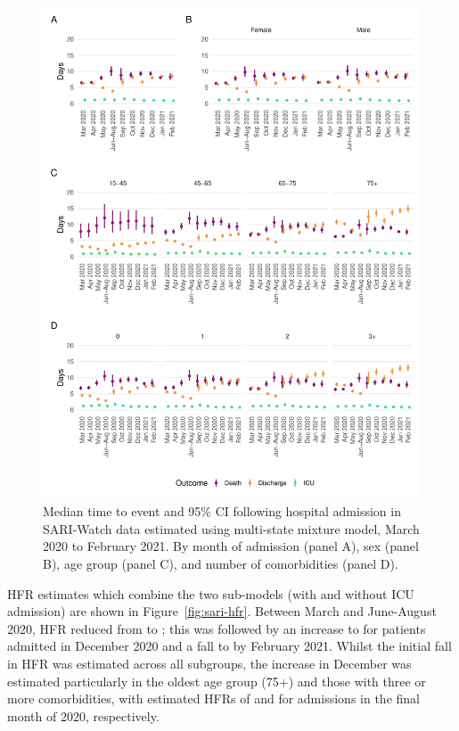 \begin{figure}[htbp!]
    \centering
    \includegraphics[width=\textwidth]{sari_med_time.pdf}
    \caption[Median time to event following hospital admission in SARI-Watch data estimated using multi-state mixture model, March 2020 to February 2021]{Median time to event and 95\% CI following hospital admission in SARI-Watch data estimated using multi-state mixture model, March 2020 to February 2021. By month of admission (panel A), sex (panel B), age group (panel C), and number of comorbidities (panel D).}\label{fig:sari-med-time}
\end{figure}

HFR estimates which combine the two sub-models (with and without ICU admission) are shown in Figure~\ref{fig:sari-hfr}. Between March and June-August 2020, HFR reduced from  to ; this was followed by an increase to  for patients admitted in December 2020 and a fall to  by February 2021. Whilst the initial fall in HFR was estimated across all subgroups, the increase in December was estimated particularly in the oldest age group (75+) and those with three or more comorbidities, with estimated HFRs of  and  for admissions in the final month of 2020, respectively.
\newline

